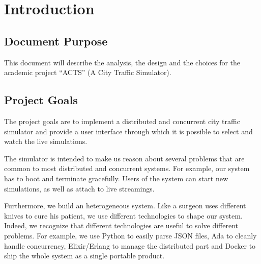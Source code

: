 \section{Introduction}
\subsection{Document Purpose}
This document will describe the analysis, the design and the choices for the
academic project ``ACTS'' (A City Traffic Simulator).

\subsection{Project Goals}\label{projectGoals}
The project goals are to implement a distributed and concurrent city
traffic simulator and provide a user interface through which it is possible to
select and watch the live simulations.

The simulator is intended to make us reason about several problems that
are common to most distributed and concurrent systems. For
example, our system has to boot and terminate gracefully.
Users of the system can start new simulations, as well as attach to live
streamings.

Furthermore, we build an heterogeneous system.
Like a surgeon uses different knives to cure his patient, we use different
technologies to shape our system.
Indeed, we recognize that different technologies are useful to solve
different problems. For example, we use Python to easily parse JSON files,
Ada to cleanly handle concurrency, Elixir/Erlang to manage
the distributed part and Docker to ship the whole system as a
single portable product.
